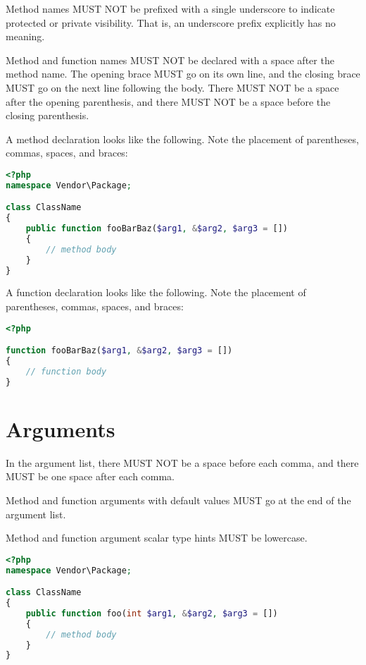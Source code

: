 Method names MUST NOT be prefixed with a single underscore to indicate protected or private visibility. That is, an underscore prefix explicitly has no meaning.

Method and function names MUST NOT be declared with a space after the method name. The opening brace MUST go on its own line, and the closing brace MUST go on the next line following the body. There MUST NOT be a space after the opening parenthesis, and there MUST NOT be a space before the closing parenthesis.

A method declaration looks like the following. Note the placement of parentheses, commas, spaces, and braces:





\begin{lstlisting}[language=PHP]
<?php
namespace Vendor\Package;

class ClassName
{
    public function fooBarBaz($arg1, &$arg2, $arg3 = [])
    {
        // method body
    }
}
\end{lstlisting}

A function declaration looks like the following. Note the placement of parentheses, commas, spaces, and braces:



\begin{lstlisting}[language=PHP]
<?php

function fooBarBaz($arg1, &$arg2, $arg3 = [])
{
    // function body
}
\end{lstlisting}


\section{Arguments}

In the argument list, there MUST NOT be a space before each comma, and there MUST be one space after each comma.

Method and function arguments with default values MUST go at the end of the argument list.

Method and function argument scalar type hints MUST be lowercase.




\begin{lstlisting}[language=PHP]
<?php
namespace Vendor\Package;

class ClassName
{
    public function foo(int $arg1, &$arg2, $arg3 = [])
    {
        // method body
    }
}
\end{lstlisting}

